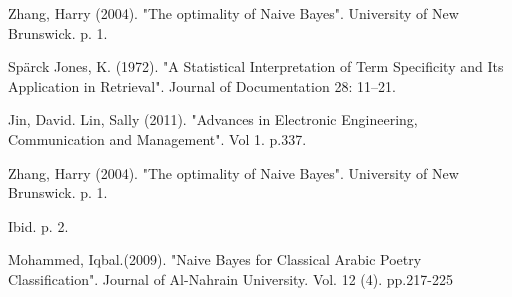 \documentclass[a4paper]{article}
\begin{document}
\begin{thebibliography}{9}

Zhang, Harry (2004). "The optimality of Naive Bayes". University of New Brunswick. p. 1.


Spärck Jones, K. (1972). "A Statistical Interpretation of Term Specificity and Its Application in Retrieval". Journal of Documentation 28: 11–21.

Jin, David. Lin, Sally (2011). "Advances in Electronic Engineering, Communication and Management". Vol 1. p.337.

Zhang, Harry (2004). "The optimality of Naive Bayes". University of New Brunswick. p. 1.


Ibid. p. 2.

Mohammed, Iqbal.(2009). "Naive Bayes for Classical Arabic Poetry Classification". Journal of Al-Nahrain University. Vol. 12 (4). pp.217-225
\end{thebibliography}






\end{document}
